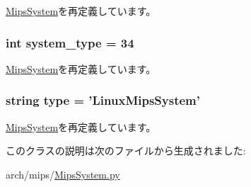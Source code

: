 \hyperlink{classMipsSystem_1_1MipsSystem_a0f86e3835b8bf2135faf7b1bab968494}{MipsSystem}を再定義しています。\hypertarget{classMipsSystem_1_1LinuxMipsSystem_acfe3506cfe10e05a2cb2c2973dc5dad2}{
\subsubsection[{system\_\-type}]{\setlength{\rightskip}{0pt plus 5cm}int system\_\-type = 34}}
\label{classMipsSystem_1_1LinuxMipsSystem_acfe3506cfe10e05a2cb2c2973dc5dad2}


\hyperlink{classMipsSystem_1_1MipsSystem_af401252d15d9cecde29d1fdcbaba250d}{MipsSystem}を再定義しています。\hypertarget{classMipsSystem_1_1LinuxMipsSystem_acce15679d830831b0bbe8ebc2a60b2ca}{
\subsubsection[{type}]{\setlength{\rightskip}{0pt plus 5cm}string type = '{\bf LinuxMipsSystem}'}}
\label{classMipsSystem_1_1LinuxMipsSystem_acce15679d830831b0bbe8ebc2a60b2ca}


\hyperlink{classMipsSystem_1_1MipsSystem_acce15679d830831b0bbe8ebc2a60b2ca}{MipsSystem}を再定義しています。

このクラスの説明は次のファイルから生成されました:\begin{DoxyCompactItemize}
\item 
arch/mips/\hyperlink{MipsSystem_8py}{MipsSystem.py}\end{DoxyCompactItemize}
